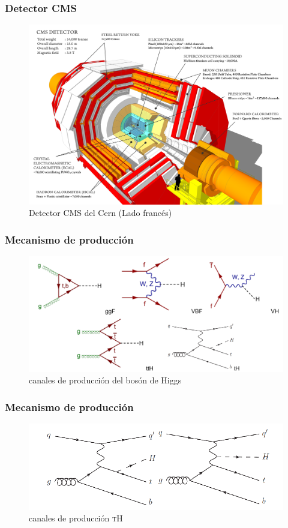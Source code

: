 \documentclass[11pt]{beamer}
\begin{document}
\begin{frame}
\frametitle{Detector CMS}
\begin{center}
\begin{figure}
	\includegraphics[width=\linewidth]{cms.png}
	\caption{Detector CMS del Cern (Lado franc\'es)}
\end{figure}
\end{center}
\end{frame}
\begin{frame}
\frametitle{Mecanismo de producci\'on}
\begin{center}
\begin{figure}
\includegraphics[width=\linewidth]{pg.png}
\caption{canales de producci\'on del bos\'on de Higgs}
\end{figure}
\end{center}
\end{frame}

\begin{frame}
\frametitle{Mecanismo de producci\'on}
\begin{center}
\begin{figure}
\includegraphics[width=\linewidth]{tq.png}
\caption{canales de producci\'on \textsc{tH}}
\end{figure}
\end{center}	
\end{frame}
\end{document}
